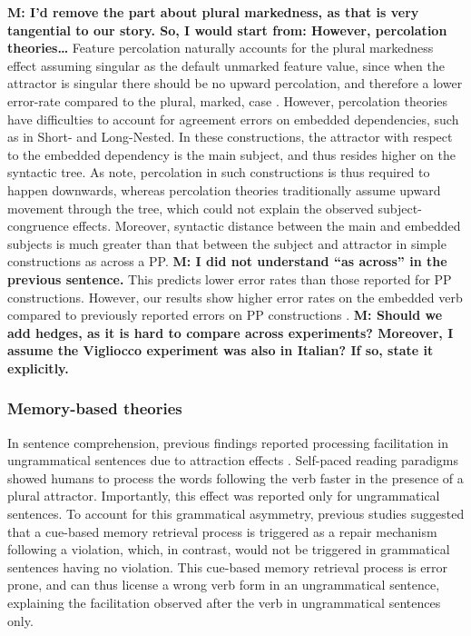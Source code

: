 \textbf{\textbf{M: I'd remove the part about plural markedness, as that is very tangential to our story. So, I would start from: However, percolation theories\ldots}} Feature percolation naturally accounts for the plural markedness effect assuming singular as the default unmarked feature value,
since when the attractor is singular there should be no upward percolation, and therefore a lower error-rate compared to the plural, marked, case \citep{pearlmutter1999agreement}. However, percolation theories have difficulties to account for agreement errors on embedded dependencies, such as in Short- and Long-Nested. In these constructions, the attractor with respect to the embedded dependency is the main subject, and thus resides higher on the syntactic tree. As \citet{wagers2009agreement} note, percolation in such constructions is thus required to happen downwards, whereas percolation theories traditionally assume upward movement through the tree, which could not explain the observed subject-congruence effects. Moreover, syntactic distance between the main and embedded subjects is much greater than that between the subject and attractor in simple constructions as across a PP. \textbf{M: I did not understand ``as across'' in the previous sentence.} This predicts lower error rates than those reported for PP constructions. However, our results show higher error rates on the embedded verb compared to previously reported errors on PP constructions \citep{vigliocco1995constructing}. \textbf{M: Should we add hedges, as it is hard to compare across experiments? Moreover, I assume the Vigliocco experiment was also in Italian? If so, state it explicitly.}

\subsubsection{Memory-based theories}
In sentence comprehension, previous findings reported processing facilitation in ungrammatical sentences due to attraction effects \citep[e.g., ][]{pearlmutter1999agreement, wagers2009agreement, lago2015agreement}. Self-paced reading paradigms showed humans to process the words following the verb faster in the presence of a plural attractor. Importantly, this effect was reported only for ungrammatical sentences. To account for this grammatical asymmetry, previous studies suggested that a cue-based memory retrieval process \citep{lewis2005activation} is triggered as a repair mechanism following a violation, which, in contrast, would not be triggered in grammatical sentences having no violation. This cue-based memory retrieval process is error prone, and can thus license a wrong verb form in an ungrammatical sentence, explaining the facilitation observed after the verb in ungrammatical sentences only. 


